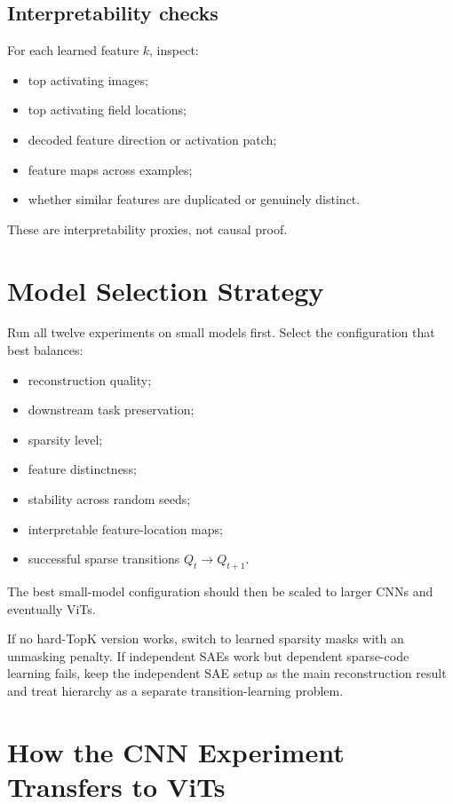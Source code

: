 \documentclass[11pt]{article}
\begin{document}
\subsection{Interpretability checks}

For each learned feature \(k\), inspect:
\begin{itemize}[leftmargin=*]
    \item top activating images;
    \item top activating field locations;
    \item decoded feature direction or activation patch;
    \item feature maps across examples;
    \item whether similar features are duplicated or genuinely distinct.
\end{itemize}

These are interpretability proxies, not causal proof.

\section{Model Selection Strategy}

Run all twelve experiments on small models first. Select the configuration that best balances:

\begin{itemize}[leftmargin=*]
    \item reconstruction quality;
    \item downstream task preservation;
    \item sparsity level;
    \item feature distinctness;
    \item stability across random seeds;
    \item interpretable feature-location maps;
    \item successful sparse transitions \(Q_t \rightarrow Q_{t+1}\).
\end{itemize}

The best small-model configuration should then be scaled to larger CNNs and eventually ViTs.

If no hard-TopK version works, switch to learned sparsity masks with an unmasking penalty. If independent SAEs work but dependent sparse-code learning fails, keep the independent SAE setup as the main reconstruction result and treat hierarchy as a separate transition-learning problem.

\section{How the CNN Experiment Transfers to ViTs}
\end{document}
